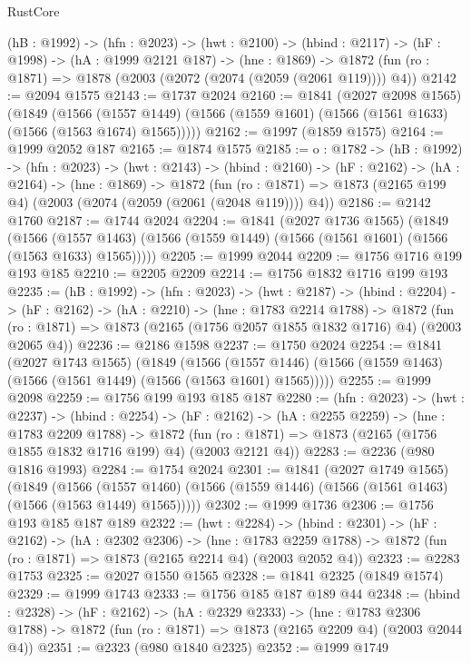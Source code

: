 \begin{lexlean}{RustCore}
\begin{coremodule}
  (hB : @1992) ->
  (hfn : @2023) ->
  (hwt : @2100) ->
  (hbind : @2117) ->
  (hF : @1998) ->
  (hA : @1999 @2121 @187) ->
  (hne : @1869) -> @1872 (fun (ro : @1871) => @1878 (@2003 (@2072 (@2074 (@2059 (@2061 @119)))) @4))
@2142 := @2094 @1575
@2143 := @1737 @2024
@2160 := @1841
    (@2027 @2098 @1565)
    (@1849
      (@1566 (@1557 @1449) (@1566 (@1559 @1601) (@1566 (@1561 @1633) (@1566 (@1563 @1674) @1565)))))
@2162 := @1997 (@1859 @1575)
@2164 := @1999 @2052 @187
@2165 := @1874 @1575
@2185 := {o : @1782} ->
  (hB : @1992) ->
  (hfn : @2023) ->
  (hwt : @2143) ->
  (hbind : @2160) ->
  (hF : @2162) ->
  (hA : @2164) ->
  (hne : @1869) ->
  @1872 (fun (ro : @1871) => @1873 (@2165 @199 @4) (@2003 (@2074 (@2059 (@2061 (@2048 @119)))) @4))
@2186 := @2142 @1760
@2187 := @1744 @2024
@2204 := @1841
    (@2027 @1736 @1565)
    (@1849
      (@1566 (@1557 @1463) (@1566 (@1559 @1449) (@1566 (@1561 @1601) (@1566 (@1563 @1633) @1565)))))
@2205 := @1999 @2044
@2209 := @1756 @1716 @199 @193 @185
@2210 := @2205 @2209
@2214 := @1756 @1832 @1716 @199 @193
@2235 := (hB : @1992) ->
  (hfn : @2023) ->
  (hwt : @2187) ->
  (hbind : @2204) ->
  (hF : @2162) ->
  (hA : @2210) ->
  (hne : @1783 @2214 @1788) ->
  @1872 (fun (ro : @1871) => @1873 (@2165 (@1756 @2057 @1855 @1832 @1716) @4) (@2003 @2065 @4))
@2236 := @2186 @1598
@2237 := @1750 @2024
@2254 := @1841
    (@2027 @1743 @1565)
    (@1849
      (@1566 (@1557 @1446) (@1566 (@1559 @1463) (@1566 (@1561 @1449) (@1566 (@1563 @1601) @1565)))))
@2255 := @1999 @2098
@2259 := @1756 @199 @193 @185 @187
@2280 := (hfn : @2023) ->
  (hwt : @2237) ->
  (hbind : @2254) ->
  (hF : @2162) ->
  (hA : @2255 @2259) ->
  (hne : @1783 @2209 @1788) ->
  @1872 (fun (ro : @1871) => @1873 (@2165 (@1756 @1855 @1832 @1716 @199) @4) (@2003 @2121 @4))
@2283 := @2236 (@980 @1816 @1993)
@2284 := @1754 @2024
@2301 := @1841
    (@2027 @1749 @1565)
    (@1849
      (@1566 (@1557 @1460) (@1566 (@1559 @1446) (@1566 (@1561 @1463) (@1566 (@1563 @1449) @1565)))))
@2302 := @1999 @1736
@2306 := @1756 @193 @185 @187 @189
@2322 := (hwt : @2284) ->
  (hbind : @2301) ->
  (hF : @2162) ->
  (hA : @2302 @2306) ->
  (hne : @1783 @2259 @1788) -> @1872 (fun (ro : @1871) => @1873 (@2165 @2214 @4) (@2003 @2052 @4))
@2323 := @2283 @1753
@2325 := @2027 @1550 @1565
@2328 := @1841 @2325 (@1849 @1574)
@2329 := @1999 @1743
@2333 := @1756 @185 @187 @189 @44
@2348 := (hbind : @2328) ->
  (hF : @2162) ->
  (hA : @2329 @2333) ->
  (hne : @1783 @2306 @1788) -> @1872 (fun (ro : @1871) => @1873 (@2165 @2209 @4) (@2003 @2044 @4))
@2351 := @2323 (@980 @1840 @2325)
@2352 := @1999 @1749

\end{coremodule}
\end{lexlean}
